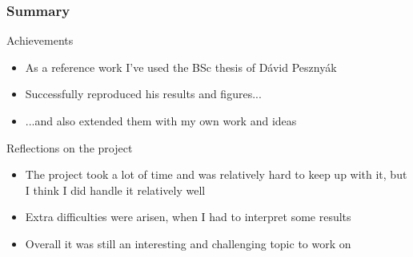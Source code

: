 \begin{frame}
\frametitle{Summary}

\begin{exampleblock}{Achievements}
	\begin{itemize}
		\item As a reference work I've used the BSc thesis of Dávid Pesznyák
		\item Successfully reproduced his results and figures...
		\item ...and also extended them with my own work and ideas
	\end{itemize}
\end{exampleblock}

\begin{block}{Reflections on the project}
	\begin{itemize}
		\item The project took a lot of time and was relatively hard to keep up with it, but I think I did handle it relatively well
		\item Extra difficulties were arisen, when I had to interpret some results
		\item Overall it was still an interesting and challenging topic to work on
	\end{itemize}
\end{block}

\end{frame}
